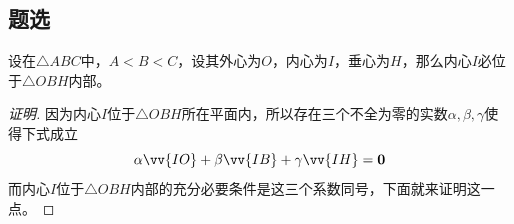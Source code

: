 \subsection{题选}
\label{sec:exercise-for-triangle}

\begin{exercise}
  设在$\triangle{ABC}$中，$A<B<C$，设其外心为$O$，内心为$I$，垂心为$H$，那么内心$I$必位于$\triangle{OBH}$内部。
\end{exercise}

\exerciseFrom[\url{http://kuing.orzweb.net/viewthread.php?tid=4973}]

\exerciseSolvedDate[2017-11-03]

\begin{proof}[证明]
  因为内心$I$位于$\triangle{OBH}$所在平面内，所以存在三个不全为零的实数$\alpha,\beta,\gamma$使得下式成立
  \[ \alpha \vv{IO} + \beta \vv{IB} + \gamma \vv{IH} = \bm{0} \]
  而内心$I$位于$\triangle{OBH}$内部的充分必要条件是这三个系数同号，下面就来证明这一点。


\end{proof}

